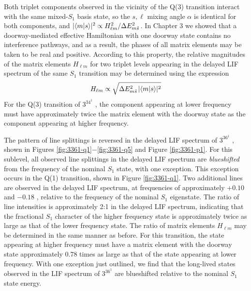 \documentclass[12pt]{mitthesis}
\begin{document}
Both triplet components observed in the vicinity of the Q(3)
transition interact with the same mixed-$S_1$ basis state, so the
$s,\ell$ mixing angle $\alpha$ is identical for both components, and
$\lvert \mathinner{\langle{m|s}\rangle} \rvert^2 \propto H_{\ell m}^2 / \Delta E_{m
  \tilde{s}\,}^2$.  In Chapter 3 we showed that a doorway-mediated effective
Hamiltonian with one doorway state contains no interference pathways,
and as a result, the phases of all matrix elements may be taken to be
real and positive.  According to this property, the relative
magnitudes of the matrix elements $H_{\ell m}$ for two triplet levels
appearing in the delayed LIF spectrum of the same $S_1$ transition may
be determined using the expression
\begin{equation}
  \label{eq:approx-hlm}
  H_{\ell m} \propto \sqrt{ \Delta E_{m \tilde{s}\,}^2 \lvert \mathinner{\langle{m|s}\rangle} \rvert^2 }
\end{equation}
For the Q(3) transition of $3^34^1$ , the component appearing at
lower frequency must have approximately twice the matrix element with
the doorway state as the component appearing at higher frequency.

The pattern of line splittings is reversed in the delayed LIF spectrum
of $3^36^1$ , shown in Figures
\ref{fig:3361-q1}$-$\ref{fig:3361-q5} and Figure \ref{fig:3361-p1}.
For this sublevel, all observed line splittings in the delayed LIF
spectrum are \emph{blueshifted} from the frequency of the nominal
$S_1$ state, with one exception.  This exception occurs in the Q(1)
transition, shown in Figure \ref{fig:3361-q1}.  Two additional lines
are observed in the delayed LIF spectrum, at frequencies of
approximately $+0.10$ and $-0.18$ \rcm, relative to the frequency of
the nominal $S_1$ eigenstate.  The ratio of line intensities is
approximately 2:1 in the delayed LIF spectrum, indicating that the
fractional $S_1$ character of the higher frequency state is
approximately twice as large as that of the lower frequency state.
The ratio of matrix elements $H_{\ell m}$ may be determined in the
same manner as before.  For this transition, the state appearing at
higher frequency must have a matrix element with the doorway state
approximately 0.78 times as large as that of the state appearing at
lower frequency.  With one exception just outlined, we find that the
long-lived states observed in the LIF spectrum of $3^36^1$  are
blueshifted relative to the nominal $S_1$ state energy.
\end{document}
